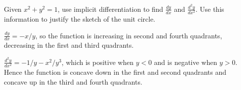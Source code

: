 {Given $x^2+y^2=1$, use implicit differentiation to find $\frac{dy}{dx}$ and $\frac{d^2y}{dx^2}$. Use this information to justify the sketch of the unit circle.
}
{$\frac{dy}{dx} = -x/y$, so the function is increasing in second and fourth quadrants, decreasing in the first and third quadrants.

$\frac{d^2y}{dx^2} = -1/y - x^2/y^3$, which is positive when $y<0$ and is negative when $y>0$. Hence the function is concave down in the first and second quadrants and concave up in the third and fourth quadrants.
}

